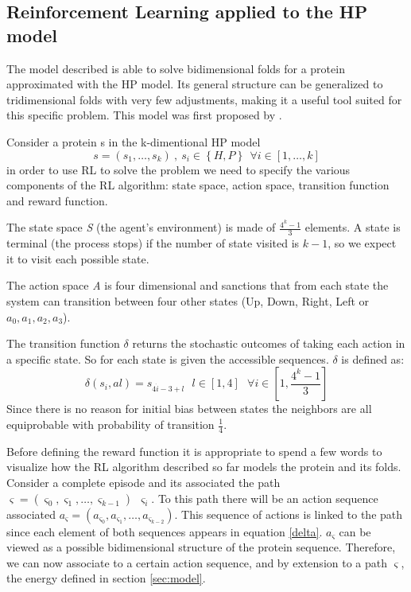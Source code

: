\subsection{Reinforcement Learning applied to the HP model}
The model described is able to solve bidimensional folds for a protein approximated with the HP model.
Its general structure can be generalized to tridimensional folds with very few adjustments, making it a useful tool suited for this specific problem.
This model was first proposed by \cite{czibula2011reinforcement}.

Consider a protein s in the k-dimentional HP model $$s = \left(s_1, \ldots, s_k\right) \ , \ s_i \in \left\{H, P\right\} \ \ \forall i \in \left[1,\ldots,k\right]$$ in order to use RL to solve the problem we need to specify the various components of the RL algorithm: state space, action space, transition function and reward function.

The state space \emph{S} (the agent's environment) is made of $\frac{4^{k}-1}{3}$ elements.
A state is terminal (the process stops) if the number of state visited is $k-1$, so we expect it to visit each possible state. 

The action space \emph{A} is four dimensional and sanctions that from each state the system can transition between four other states (Up, Down, Right, Left or $a_{0}, a_{1}, a_{2}, a_{3}$).

The transition function $\delta$ returns the stochastic outcomes of taking each action in a specific state.
So for each state is given the accessible sequences.
$\delta$ is defined as:
\begin{equation} \label{delta}
\delta(s_{i},a{l})=s_{4 \dot i - 3 + l} \ \ \ l \in [1, 4] \ \ \ \forall i \in \left[1,\frac{4^{k}-1}{3}\right]
\end{equation}
Since there is no reason for initial bias between states the neighbors are all equiprobable with probability of transition $\frac{1}{4}$.

Before defining the reward function it is appropriate to spend a few words to visualize how the RL algorithm described so far models the protein and its folds.
Consider a complete episode and its associated the path $\varsigma = (\varsigma_{0}, \varsigma_1, \ldots , \varsigma_{k-1}) \ \ \varsigma_{i}$.
To this path there will be an action sequence associated $a_{\varsigma} = (a_{\varsigma_{0}}, a_{\varsigma_{1}}, \ldots , a_{\varsigma_{k-2}})$.
This sequence of actions is linked to the path since each element of both sequences appears in equation \ref{delta}.
$a_{\varsigma}$ can be viewed as a possible bidimensional structure of the protein sequence.
Therefore, we can now associate to a certain action sequence, and by extension to a path $\varsigma$, the energy defined in section \ref{sec:model}. 

